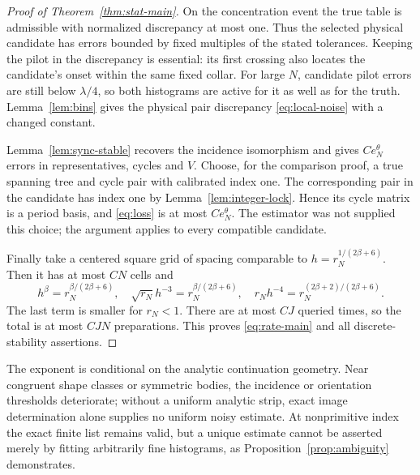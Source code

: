 \begin{proof}[Proof of Theorem~\ref{thm:stat-main}]
On the concentration event the true table is admissible with normalized
discrepancy at most one. Thus the selected physical candidate has errors
bounded by fixed multiples of the stated tolerances. Keeping the pilot
in the discrepancy is essential: its first crossing also locates the
candidate's onset within the same fixed collar. For large $N$, candidate
pilot errors are still below $\lambda/4$, so both histograms are active
for it as well as for the truth. Lemma~\ref{lem:bins} gives the physical
pair discrepancy \eqref{eq:local-noise} with a changed constant.

Lemma~\ref{lem:sync-stable} recovers the incidence isomorphism and gives
$Ce_N^\theta$ errors in representatives, cycles and $V$. Choose, for the
comparison proof, a true spanning tree and cycle pair with calibrated
index one. The corresponding pair in the candidate has index one by
Lemma~\ref{lem:integer-lock}. Hence its cycle matrix is a period basis,
and \eqref{eq:loss} is at most $Ce_N^\theta$. The estimator was not
supplied this choice; the argument applies to every compatible candidate.

Finally take a centered square grid of spacing comparable to
$h=r_N^{1/(2\beta+6)}$. Then it has at most $CN$ cells and
\[
 h^\beta= r_N^{\beta/(2\beta+6)},\quad
 \sqrt{r_N}h^{-3}= r_N^{\beta/(2\beta+6)},\quad
 r_Nh^{-4}= r_N^{(2\beta+2)/(2\beta+6)}.
\]
The last term is smaller for $r_N<1$. There are at most $CJ$ queried
times, so the total is at most $CJN$ preparations. This proves
\eqref{eq:rate-main} and all discrete-stability assertions.
\end{proof}

The exponent is conditional on the analytic continuation geometry.
Near congruent shape classes or symmetric bodies, the incidence or
orientation thresholds deteriorate; without a uniform analytic strip,
exact image determination alone supplies no uniform noisy estimate.
At nonprimitive index the exact finite list remains valid, but a unique
estimate cannot be asserted merely by fitting arbitrarily fine histograms,
as Proposition~\ref{prop:ambiguity} demonstrates.
